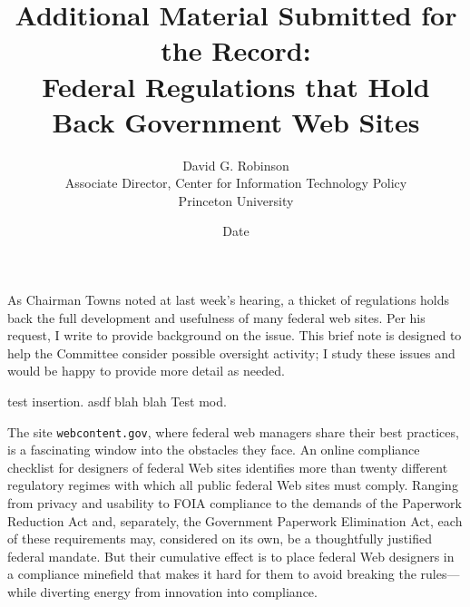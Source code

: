\documentclass{article}
\title{Additional Material Submitted for the Record: \\
Federal Regulations that Hold Back Government Web Sites}
\author{David G. Robinson\\
Associate Director, Center for Information Technology Policy\\
Princeton University}
\date{Date}
\begin{document}
   \maketitle
 As Chairman Towns noted at last week's hearing, a thicket of regulations 
holds back the full development and usefulness of many federal web sites. Per 
his request, I write to provide background on the issue. This brief note is 
designed to help the Committee consider possible oversight activity; I study 
these issues and would be happy to provide more detail as needed.

test insertion.
asdf blah blah Test mod.

The site \texttt{webcontent.gov}, where federal web managers share their best 
practices, is a fascinating window into the obstacles they face. An online 
compliance checklist for designers of federal Web sites identifies more than 
twenty different regulatory regimes with which all public federal Web sites 
must comply.  Ranging from privacy and usability to FOIA compliance to the 
demands of the Paperwork Reduction Act and, separately, the Government 
Paperwork Elimination Act, each of these requirements may, considered on its 
own, be a thoughtfully justified federal mandate. But their cumulative effect 
is to place federal Web designers in a compliance minefield that makes it hard 
for them to avoid breaking the rules—while diverting energy from innovation 
into compliance.


\end{document}
